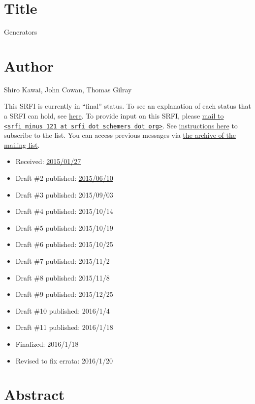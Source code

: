 \section{Title}\label{title}

Generators

\section{Author}\label{author}

Shiro Kawai, John Cowan, Thomas Gilray

This SRFI is currently in ``final'' status. To see an explanation of
each status that a SRFI can hold, see
\href{http://srfi.schemers.org/srfi-process.html}{here}. To provide
input on this SRFI, please
\href{mailto:srfi\%20minus\%20121\%20at\%20srfi\%20dot\%20schemers\%20dot\%20org}{mail
to
\texttt{\textless{}srfi\ minus\ 121\ at\ srfi\ dot\ schemers\ dot\ org\textgreater{}}}.
See
\href{http://srfi.schemers.org/srfi-list-subscribe.html}{instructions
here} to subscribe to the list. You can access previous messages via
\href{http://srfi.schemers.org/srfi-121/mail-archive/maillist.html}{the
archive of the mailing list}.

\begin{itemize}
\tightlist
\item
  Received:
  \href{http://srfi.schemers.org/srfi-121/srfi-121-1.1.html}{2015/01/27}
\item
  Draft \#2 published:
  \href{http://srfi.schemers.org/srfi-121/srfi-121-1.2.html}{2015/06/10}
\item
  Draft \#3 published: 2015/09/03
\item
  Draft \#4 published: 2015/10/14
\item
  Draft \#5 published: 2015/10/19
\item
  Draft \#6 published: 2015/10/25
\item
  Draft \#7 published: 2015/11/2
\item
  Draft \#8 published: 2015/11/8
\item
  Draft \#9 published: 2015/12/25
\item
  Draft \#10 published: 2016/1/4
\item
  Draft \#11 published: 2016/1/18
\item
  Finalized: 2016/1/18
\item
  Revised to fix errata: 2016/1/20
\end{itemize}

\section{Abstract}\label{abstract}

